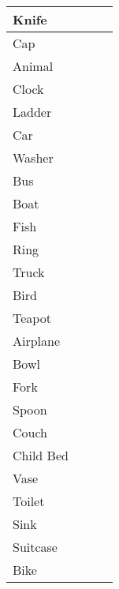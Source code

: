\documentclass{article}
\begin{document}
\begin{longtable}{|l|l|l|l|}
Knife         &          &                &            \\ \hline
Cap           &          &                &            \\ \hline
Animal        &          &                &            \\ \hline
Clock         &          &                &            \\ \hline
Ladder        &          &                &            \\ \hline
Car           &          &                &            \\ \hline
Washer        &          &                &            \\ \hline
Bus           &          &                &            \\ \hline
Boat          &          &                &            \\ \hline
Fish          &          &                &            \\ \hline
Ring          &          &                &            \\ \hline
Truck         &          &                &            \\ \hline
Bird          &          &                &            \\ \hline
Teapot        &          &                &            \\ \hline
Airplane      &          &                &            \\ \hline
Bowl          &          &                &            \\ \hline
Fork          &          &                &            \\ \hline
Spoon         &          &                &            \\ \hline
Couch         &          &                &            \\ \hline
Child Bed     &          &                &            \\ \hline
Vase          &          &                &            \\ \hline
Toilet        &          &                &            \\ \hline
Sink          &          &                &            \\ \hline
Suitcase      &          &                &            \\ \hline
Bike          &          &                &            \\ \hline
\end{longtable}
\end{document}
